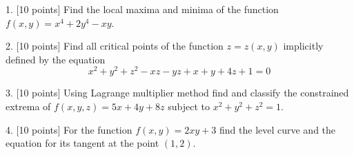\documentclass[12pt,a4paper]{article}
\begin{document}

1. {[10 points]} 
Find the local maxima and minima of the function $f(x,y)=x^4+2y^4-xy$. 

\newpage
{}

2. {[10 points]} 
Find all critical points of the function $z=z(x,y)$ implicitly defined by the equation
\begin{equation}
x^2+y^2+z^2-xz-yz+x+y+4z+1=0
\end{equation}

\newpage
{}

3. {[10 points]} Using Lagrange multiplier method find and classify the constrained extrema of $f(x, y, z) =  5x +4y + 8z$ subject to $x^2 + y^2 + z^2 = 1$.



\newpage
{}

4. {[10 points]}
For the function $f(x,y)=2xy+3$ find the level curve and the equation for its tangent at the point $(1,2)$.

\newpage
{}
\end{document}
